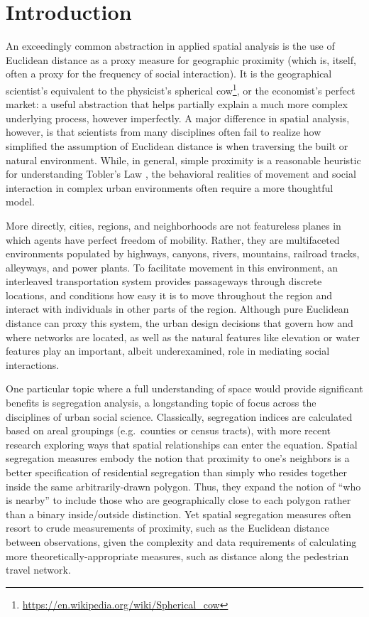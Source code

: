 \documentclass[
  10pt,
]{article}
\begin{document}
\setlength{\parindent}{16pt}
\setlength{\parskip}{0pt}

\hypertarget{introduction}{%
\section{Introduction}\label{introduction}}

An exceedingly common abstraction in applied spatial analysis is the use
of Euclidean distance as a proxy measure for geographic proximity (which
is, itself, often a proxy for the frequency of social interaction). It
is the geographical scientist's equivalent to the physicist's spherical
cow\footnote{\url{https://en.wikipedia.org/wiki/Spherical_cow}}, or the
economist's perfect market: a useful abstraction that helps partially
explain a much more complex underlying process, however imperfectly. A
major difference in spatial analysis, however, is that scientists from
many disciplines often fail to realize how simplified the assumption of
Euclidean distance is when traversing the built or natural environment.
While, in general, simple proximity is a reasonable heuristic for
understanding Tobler's Law \citep{tobler1970ComputerMovie}, the
behavioral realities of movement and social interaction in complex urban
environments often require a more thoughtful model.

More directly, cities, regions, and neighborhoods are not featureless
planes in which agents have perfect freedom of mobility. Rather, they
are multifaceted environments populated by highways, canyons, rivers,
mountains, railroad tracks, alleyways, and power plants. To facilitate
movement in this environment, an interleaved transportation system
provides passageways through discrete locations, and conditions how easy
it is to move throughout the region and interact with individuals in
other parts of the region. Although pure Euclidean distance can proxy
this system, the urban design decisions that govern how and where
networks are located, as well as the natural features like elevation or
water features play an important, albeit underexamined, role in
mediating social interactions.

One particular topic where a full understanding of space would provide
significant benefits is segregation analysis, a longstanding topic of
focus across the disciplines of urban social science. Classically,
segregation indices are calculated based on areal groupings
(e.g.~counties or census tracts), with more recent research exploring
ways that spatial relationships can enter the equation. Spatial
segregation measures embody the notion that proximity to one's neighbors
is a better specification of residential segregation than simply who
resides together inside the same arbitrarily-drawn polygon. Thus, they
expand the notion of ``who is nearby'' to include those who are
geographically close to each polygon rather than a binary inside/outside
distinction. Yet spatial segregation measures often resort to crude
measurements of proximity, such as the Euclidean distance between
observations, given the complexity and data requirements of calculating
more theoretically-appropriate measures, such as distance along the
pedestrian travel network.
\end{document}
